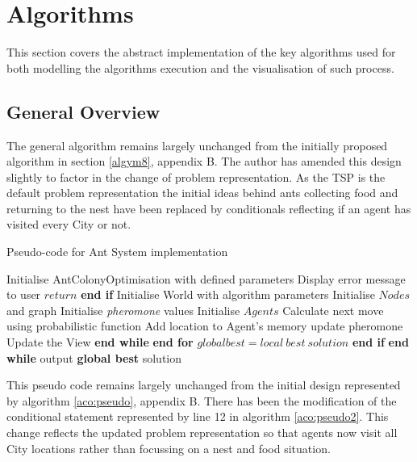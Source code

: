 \section{Algorithms}

This section covers the abstract implementation of the key algorithms used for both modelling the algorithms execution and the visualisation of such process.

\subsection{General Overview}

The general algorithm remains largely unchanged from the initially proposed algorithm in section \ref{algym8}, appendix B. The author has amended this design slightly to factor in the change of problem representation. As the TSP is the default problem representation the initial ideas behind ants collecting food and returning to the nest have been replaced by conditionals reflecting if an agent has visited every City or not.

\begin{algorithm}[H]
\caption[Ant System Pseudo-code]{Pseudo-code for Ant System implementation}
\label{aco:pseudo2}
\begin{algorithmic}[1]
\State Initialise AntColonyOptimisation with defined parameters
\State Display error message to user
\State $return$
\EndIf 
\State \textbf{end if}
\State Initialise World with algorithm parameters
\State Initialise $Nodes$ and graph
\State Initialise \textit{pheromone} values
\State Initialise $Agents$
\State Calculate next move using probabilistic function 
\State Add location to Agent's memory
\State update pheromone
\State Update the View
\EndWhile 
\State \textbf{end while}
\EndFor 
\State \textbf{end for}
\EndWhile
{}
\State $global best = local\ best\ solution$
\EndIf
\State \textbf{end if}
\State \textbf{end while}
\State output \textbf{global best} solution
\end{algorithmic}
\end{algorithm}

This pseudo code remains largely unchanged from the initial design represented by algorithm \ref{aco:pseudo}, appendix B. There has been the modification of the conditional statement represented by line 12 in algorithm \ref{aco:pseudo2}. This change reflects the updated problem representation so that agents now visit all City locations rather than focussing on a nest and food situation.

